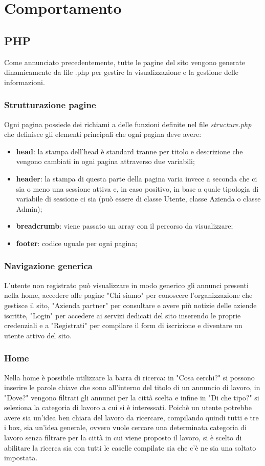 \section{Comportamento}
	\subsection{PHP}
	Come annunciato precedentemente, tutte le pagine del sito vengono generate dinamicamente da file .php per gestire la visualizzazione e la gestione delle informazioni.
	
		\subsubsection{Strutturazione pagine}
		Ogni pagina possiede dei richiami a delle funzioni definite nel file \emph{structure.php} che definisce gli elementi principali che ogni pagina deve avere:
		\begin{itemize}
			\item \textbf{head}: la stampa dell'head è standard tranne per titolo e descrizione che vengono cambiati in ogni pagina attraverso due variabili;
			\item \textbf{header}: la stampa di questa parte della pagina varia invece a seconda che ci sia o meno una sessione attiva e, in caso positivo, in base a quale tipologia di variabile di sessione ci sia (può essere di classe Utente, classe Azienda o classe Admin);
			\item \textbf{breadcrumb}: viene passato un array con il percorso da visualizzare;
			\item \textbf{footer}: codice uguale per ogni pagina;
		\end{itemize}
		\subsubsection{Navigazione generica}
		L'utente non registrato può visualizzare in modo generico gli annunci presenti nella home, accedere alle pagine "Chi siamo" per conoscere l'organizzazione che gestisce il sito, "Azienda partner" per consultare e avere più notizie delle aziende iscritte, "Login" per accedere ai servizi dedicati del sito inserendo le proprie credenziali e a "Registrati" per compilare il form di iscrizione e diventare un utente attivo del sito.
		
		\subsubsection{Home}
		Nella home è possibile utilizzare la barra di ricerca: in "Cosa cerchi?" si possono inserire le parole chiave che sono all'interno del titolo di un annuncio di lavoro, in "Dove?" vengono filtrati gli annunci per la città scelta e infine in "Di che tipo?" si seleziona la categoria di lavoro a cui si è interessati.
		Poichè un utente potrebbe avere sia un'idea ben chiara del lavoro da ricercare, compilando quindi tutti e tre i box, sia un'idea generale, ovvero vuole cercare una determinata categoria di lavoro senza filtrare per la città in cui viene proposto il lavoro, si è scelto di abilitare la ricerca sia con tutti le caselle compilate sia che c'è ne sia una soltato impostata.
